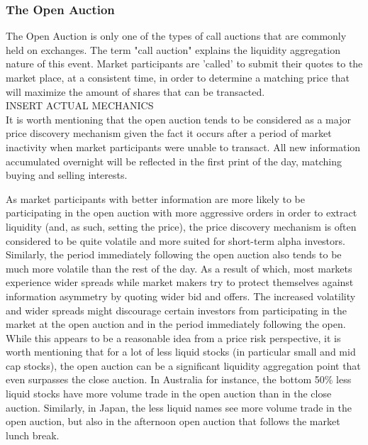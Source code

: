 \subsubsection{The Open Auction}

The Open Auction is only one of the types of call auctions that are commonly held on exchanges. The term "call auction" explains the liquidity aggregation nature of this event. Market participants are 'called' to submit their quotes to the market place, at a consistent time, in order to determine a matching price that will maximize the amount of shares that can be transacted. \\

INSERT ACTUAL MECHANICS \\

It is worth mentioning that the open auction tends to be considered as a major price discovery mechanism given the fact it occurs after a period of market inactivity when market participants were unable to transact. All new information accumulated overnight will be reflected in the first print of the day, matching buying and selling interests.  

As market participants with better information are more likely to be participating in the open auction with more aggressive orders in order to extract liquidity (and, as such, setting the price), the price discovery mechanism is often considered to be quite volatile and more suited for short-term alpha investors. Similarly, the period immediately following the open auction also tends to be much more volatile than the rest of the day. As a result of which, most markets experience wider spreads while market makers try to protect themselves against information asymmetry by quoting wider bid and offers. 
The increased volatility and wider spreads might discourage certain investors from participating in the market at the open auction and in the period immediately following the open. While this appears to be a reasonable idea from a price risk perspective, it is worth mentioning that for a lot of less liquid stocks (in particular small and mid cap stocks), the open auction can be a significant liquidity aggregation point that even surpasses the close auction. In Australia for instance, the bottom 50\% less liquid stocks have more volume trade in the open auction than in the close auction. Similarly, in Japan, the less liquid names see more volume trade in the open auction, but also in the afternoon open auction that follows the market lunch break.\\

